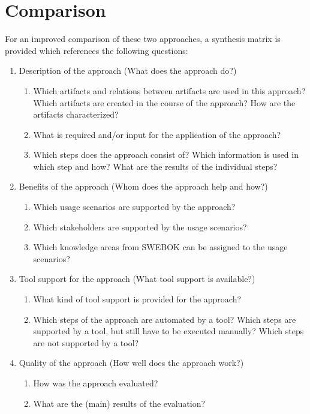 \clearpage
\section{Comparison} \label{sec:9_comparison}

For an improved comparison of these two approaches, a synthesis matrix is provided which references the following questions:

\begin{enumerate}
	\item Description of the approach (What does the approach do?)
	\begin{enumerate}
		\item Which artifacts and relations between artifacts are used in this approach? Which artifacts are created in the course of the approach? How are the artifacts characterized?
		\item What is required and/or input for the application of the approach?
		\item Which steps does the approach consist of? Which information is used in which step and how? What are the results of the individual steps?
	\end{enumerate}
	\item Benefits of the approach (Whom does the approach help and how?)
	\begin{enumerate}
		\item Which usage scenarios are supported by the approach?
		\item Which stakeholders are supported by the usage scenarios?
		\item Which knowledge areas from SWEBOK can be assigned to the usage scenarios?
	\end{enumerate}
	\item Tool support for the approach (What tool support is available?)
	\begin{enumerate}
		\item What kind of tool support is provided for the approach?
		\item Which steps of the approach are automated by a tool? Which steps are supported by a tool, but still have to be executed manually? Which steps are not supported by a tool?
	\end{enumerate}
	\item Quality of the approach (How well does the approach work?)
	\begin{enumerate}
		\item How was the approach evaluated?
		\item What are the (main) results of the evaluation?
	\end{enumerate}
\end{enumerate}


